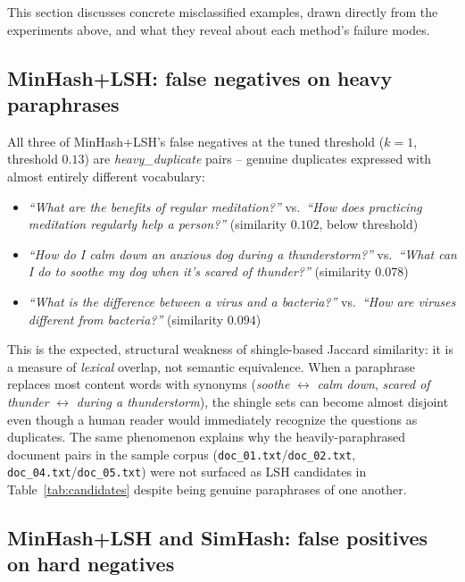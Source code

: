 \documentclass[11pt]{article}
\begin{document}
This section discusses concrete misclassified examples, drawn directly from the experiments above, and
what they reveal about each method's failure modes.

\subsection{MinHash+LSH: false negatives on heavy paraphrases}
\label{sec:error-analysis-heavy}

All three of MinHash+LSH's false negatives at the tuned threshold ($k=1$, threshold $0.13$) are
\emph{heavy\_duplicate} pairs -- genuine duplicates expressed with almost entirely different vocabulary:

\begin{itemize}
    \item \emph{``What are the benefits of regular meditation?''} vs.\ \emph{``How does practicing
          meditation regularly help a person?''} (similarity $0.102$, below threshold)
    \item \emph{``How do I calm down an anxious dog during a thunderstorm?''} vs.\ \emph{``What can I do
          to soothe my dog when it's scared of thunder?''} (similarity $0.078$)
    \item \emph{``What is the difference between a virus and a bacteria?''} vs.\ \emph{``How are viruses
          different from bacteria?''} (similarity $0.094$)
\end{itemize}

This is the expected, structural weakness of shingle-based Jaccard similarity: it is a measure of
\emph{lexical} overlap, not semantic equivalence. When a paraphrase replaces most content words with
synonyms (\emph{soothe} $\leftrightarrow$ \emph{calm down}, \emph{scared of thunder} $\leftrightarrow$
\emph{during a thunderstorm}), the shingle sets can become almost disjoint even though a human reader would
immediately recognize the questions as duplicates. The same phenomenon explains why the heavily-paraphrased
document pairs in the sample corpus (\verb|doc_01.txt|/\verb|doc_02.txt|,
\verb|doc_04.txt|/\verb|doc_05.txt|) were not surfaced as LSH candidates in
Table~\ref{tab:candidates} despite being genuine paraphrases of one another.

\subsection{MinHash+LSH and SimHash: false positives on hard negatives}
\label{sec:error-analysis-hard}
\end{document}
